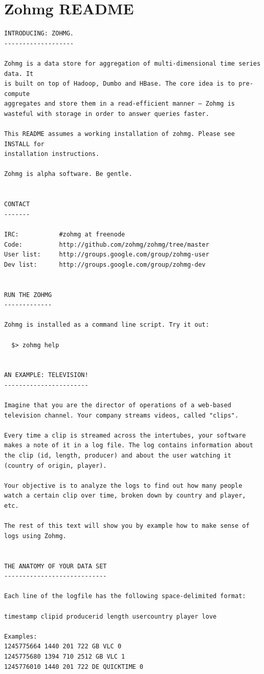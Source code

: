 \chapter{Zohmg README}

\begin{verbatim}
INTRODUCING: ZOHMG.
-------------------

Zohmg is a data store for aggregation of multi-dimensional time series data. It
is built on top of Hadoop, Dumbo and HBase. The core idea is to pre-compute
aggregates and store them in a read-efficient manner – Zohmg is
wasteful with storage in order to answer queries faster.

This README assumes a working installation of zohmg. Please see INSTALL for
installation instructions.

Zohmg is alpha software. Be gentle.


CONTACT
-------

IRC:           #zohmg at freenode
Code:          http://github.com/zohmg/zohmg/tree/master
User list:     http://groups.google.com/group/zohmg-user
Dev list:      http://groups.google.com/group/zohmg-dev


RUN THE ZOHMG
-------------

Zohmg is installed as a command line script. Try it out:

  $> zohmg help


AN EXAMPLE: TELEVISION!
-----------------------

Imagine that you are the director of operations of a web-based
television channel. Your company streams videos, called "clips".

Every time a clip is streamed across the intertubes, your software
makes a note of it in a log file. The log contains information about
the clip (id, length, producer) and about the user watching it
(country of origin, player).

Your objective is to analyze the logs to find out how many people
watch a certain clip over time, broken down by country and player,
etc.

The rest of this text will show you by example how to make sense of
logs using Zohmg.


THE ANATOMY OF YOUR DATA SET
----------------------------

Each line of the logfile has the following space-delimited format:
 
timestamp clipid producerid length usercountry player love

Examples:
1245775664 1440 201 722 GB VLC 0
1245775680 1394 710 2512 GB VLC 1
1245776010 1440 201 722 DE QUICKTIME 0


\end{verbatim}
